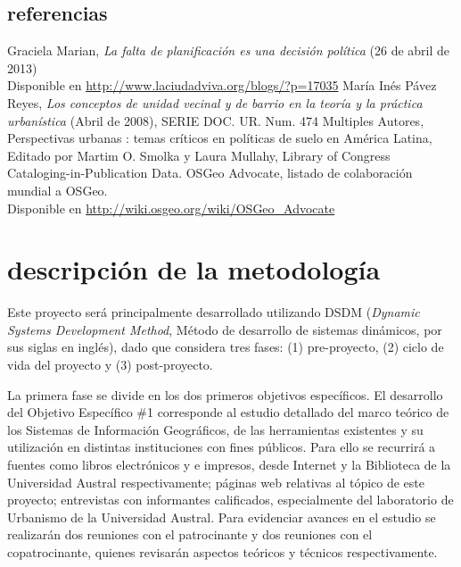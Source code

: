 \documentclass[12pt]{article}
\begin{document}
\subsection{referencias}
\begin{thebibliography}{4}
   Graciela Marian, \emph{La falta de planificación es una decisión política}
    (26 de abril de 2013)\\Disponible en \url{http://www.laciudadviva.org/blogs/?p=17035}
   María Inés Pávez Reyes, \emph{Los conceptos de unidad vecinal y de barrio en
    la teoría y la práctica urbanística} (Abril de 2008), SERIE DOC\@. UR\@. Num\@. 474
   Multiples Autores, Perspectivas urbanas : temas críticos en políticas de
    suelo en América Latina, Editado por Martim O. Smolka y Laura Mullahy, Library of Congress
    Cataloging-in-Publication Data.
   OSGeo Advocate, listado de colaboración mundial a OSGeo.\\Disponible en \url{http://wiki.osgeo.org/wiki/OSGeo_Advocate}
\end{thebibliography}



\newpage
\section{descripción de la metodología}
Este proyecto será principalmente desarrollado utilizando DSDM (\emph{Dynamic
Systems Development Method}, Método de desarrollo de sistemas dinámicos, por sus
siglas en inglés), dado que considera tres fases: (1) pre-proyecto, (2) ciclo de
vida del proyecto y (3) post-proyecto.

La primera fase se divide en los dos primeros objetivos específicos. El
desarrollo del Objetivo Específico \#1 corresponde al estudio detallado del marco teórico de los
Sistemas de Información Geográficos, de las herramientas existentes y su
utilización en distintas instituciones con fines públicos. Para ello se
recurrirá a fuentes como libros electrónicos y e impresos, desde Internet y la
Biblioteca de la Universidad Austral respectivamente; páginas web relativas al
tópico de este proyecto; entrevistas con informantes calificados, especialmente
del laboratorio de Urbanismo de la Universidad Austral. Para evidenciar avances
en el estudio se realizarán dos reuniones con el patrocinante y dos reuniones
con el copatrocinante, quienes revisarán aspectos teóricos y técnicos
respectivamente.
\end{document}
